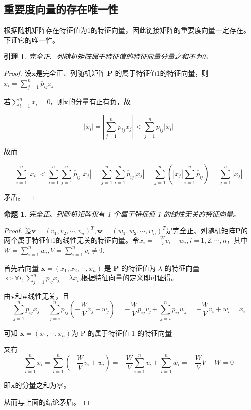 \documentclass[12pt, a4paper, oneside]{ctexbook}
\newtheorem{lemma}[theorem]{引理}
\newtheorem{proposition}[theorem]{命题}
\begin{document}
\subsection{重要度向量的存在唯一性}
根据随机矩阵存在特征值为1的特征向量，因此链接矩阵的重要度向量一定存在。下证它的唯一性。
\begin{lemma}
    完全正、列随机矩阵属于特征值的特征向量分量之和不为0。
\end{lemma}
\begin{proof}
    设$\mathbf{x}$是完全正、列随机矩阵 $\mathbf{P}$ 的属于特征值1的特征向量，则$x_i=\sum\limits_{j=1}^n\overline{\overline{p}}_{ij}x_j$
        
        若$\sum\limits_{i=1}^nx_i=0$，则$\mathbf{x}$的分量有正有负，故
        
        $$|x_i|=|\sum\limits_{j=1}^n\overline{\overline{p}}_{ij}x_j|<\sum\limits_{j=1}^n\overline{\overline{p}}_{ij}|x_i|$$

        故而

        $$\sum\limits_{i=1}^n|x_i|<\sum\limits_{i=1}^n\sum\limits_{j=1}^n\overline{\overline{p}}_{ij}|x_j|=\sum\limits_{j=1}^n\sum\limits_{i=1}^n\overline{\overline{p}}_{ij}|x_j|=\sum\limits_{j=1}^n(|x_j|\sum\limits_{i=1}^n\overline{\overline{p}}_{ij})=\sum\limits_{j=1}^n|x_j|$$

        矛盾。
\end{proof}
\begin{proposition}
    完全正、列随机矩阵仅有 1 个属于特征值 1 的线性无关的特征向量。
\end{proposition}
\begin{proof}
    
    设$\mathbf{v}=(v_1,v_2,\cdots,v_n)^T, \mathbf{w}=(w_1,w_2,\cdots,w_n)^T$是完全正、列随机矩阵$\mathbf{P}$的两个属于特征值1的线性无关的特征向量。令$x_i = -\frac{W}{V}v_i+w_i, i = 1,2,\cdots,n$，其中$W=\sum_{i=1}^nw_i, V=\sum_{i=1}^nv_i\neq 0$.
    
    首先若向量 $\mathbf{x} = (x_1,x_2,\cdots,x_n)$ 是 $\mathbf{P}$ 的特征值为 $\lambda$ 的特征向量 $\Leftrightarrow \forall i, \sum\limits_{j=1}^n p_{ij}x_j=\lambda x_i$,根据特征向量的定义即可证得。

    由$\mathbf{v}$和$\mathbf{w}$线性无关，且
    $$\sum\limits_{j=1}^n p_{ij}x_j=\sum\limits_{j=i}^n p_{ij}(-\frac{W}{V}v_j+w_j)=-\frac{W}{V} p_{ij}v_j+\sum\limits_{j=i}^n p_{ij}w_j=-\frac{W}{V}v_i+w_i=x_i$$

    可知 $\mathbf{x}=(x_1,\cdots,x_n)$为 P 的属于特征值 1 的特征向量
   
    又有
    $$\sum\limits_{i=1}^nx_i = \sum\limits_{i=1}^n(-\frac{W}{V}v_i+w_i) = -\frac{W}{V}\sum\limits_{i=1}^nv_i+\sum\limits_{i=1}^nw_i = -\frac{W}{V}V+W = 0$$

    即$\mathbf{x}$的分量之和为零。

    从而与上面的结论矛盾。
\end{proof}
\end{document}
